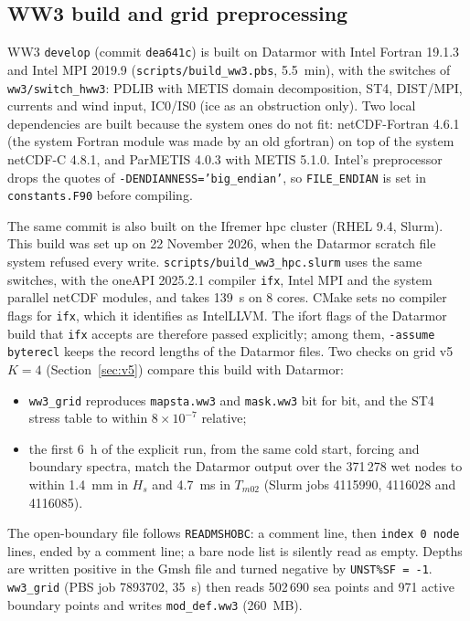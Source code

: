 \documentclass[11pt,a4paper]{article}
\begin{document}
\subsection{WW3 build and grid preprocessing}\label{sec:build}
WW3 \texttt{develop} (commit \texttt{dea641c}) is built on Datarmor with
Intel Fortran 19.1.3 and Intel MPI 2019.9 (\texttt{scripts/build\_ww3.pbs},
\SI{5.5}{min}), with the switches of \texttt{ww3/switch\_hww3}: PDLIB with
METIS domain decomposition, ST4, DIST/MPI, currents and wind input, IC0/IS0
(ice as an obstruction only). Two local dependencies are built because the
system ones do not fit: netCDF-Fortran 4.6.1 (the system Fortran module was
made by an old gfortran) on top of the system netCDF-C 4.8.1, and ParMETIS
4.0.3 with METIS 5.1.0. Intel's preprocessor drops the quotes of
\texttt{-DENDIANNESS='big\_endian'}, so \texttt{FILE\_ENDIAN} is set in
\texttt{constants.F90} before compiling.

The same commit is also built on the Ifremer hpc cluster (RHEL 9.4, Slurm).
This build was set up on 22 November 2026, when the Datarmor scratch file
system refused every write. \texttt{scripts/build\_ww3\_hpc.slurm} uses the
same switches, with the oneAPI 2025.2.1 compiler \texttt{ifx}, Intel MPI and
the system parallel netCDF modules, and takes \SI{139}{s} on 8 cores. CMake
sets no compiler flags for \texttt{ifx}, which it identifies as IntelLLVM.
The ifort flags of the Datarmor build that \texttt{ifx} accepts are
therefore passed explicitly; among them, \texttt{-assume byterecl} keeps
the record lengths of the Datarmor files. Two checks on grid v5 $K=4$
(Section~\ref{sec:v5}) compare this build with Datarmor:
\begin{itemize}
\item \texttt{ww3\_grid} reproduces \texttt{mapsta.ww3} and
\texttt{mask.ww3} bit for bit, and the ST4 stress table to within
$8\times10^{-7}$ relative;
\item the first \SI{6}{h} of the explicit run, from the same cold start,
forcing and boundary spectra, match the Datarmor output over the 371\,278
wet nodes to within \SI{1.4}{mm} in $H_s$ and \SI{4.7}{ms} in $T_{m02}$
(Slurm jobs 4115990, 4116028 and 4116085).
\end{itemize}

The open-boundary file follows \texttt{READMSHOBC}: a comment line, then
\texttt{index 0 node} lines, ended by a comment line; a bare node list is
silently read as empty. Depths are written positive in the Gmsh file and
turned negative by \texttt{UNST\%SF = -1}. \texttt{ww3\_grid}
(PBS job 7893702, \SI{35}{s}) then reads 502\,690 sea points and 971 active
boundary points and writes \texttt{mod\_def.ww3} (\SI{260}{MB}).
\end{document}
